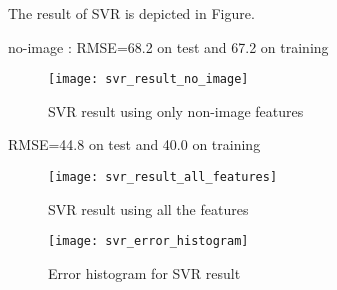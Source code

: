 The result of SVR is depicted in Figure.

no-image : RMSE=68.2 on test and 67.2 on training

\begin{figure}[h]
\caption{SVR result using only non-image features}
\label{fig:svr_result_no_image}
\texttt{[image: svr\_result\_no\_image]}
\centering
\end{figure}

RMSE=44.8 on test and 40.0 on training

\begin{figure}[h]
\caption{SVR result using all the features}
\label{fig:svr_result_all}
\texttt{[image: svr\_result\_all\_features]}
\centering
\end{figure}

\begin{figure}[h]
\caption{Error histogram for SVR result}
\label{fig:err_hist_svr}
\texttt{[image: svr\_error\_histogram]}
\centering
\end{figure}




